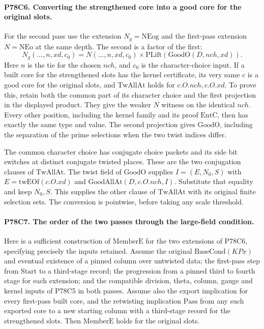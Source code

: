 \paragraph{P78C6. Converting the strengthened core into a good core for the original slots.}
For the second pass use the extension $N_g=\mathrm{NEog}$ and the
first-pass extension $N=\mathrm{NEo}$ at the same depth. The
second is a factor of the first:
\[
  N_g(\ldots,n,xd,c_0)
       = N(\ldots,n,xd,c_0)\times
            \mathrm{PLift}(\mathrm{GoodO}(D,nch,xd)).
\]
Here $n$ is the tie for the chosen $nch$, and $c_0$ is the
character-choice input. If a built core for the strengthened
slots has the kernel certificate, its very same $c$ is a good
core for the original slots, and $\mathrm{TwAllAt}$ holds for
$c.O.nch,c.O.xd$. To prove this, retain both the common part of
its character choice and the first projection in the displayed
product. They give the weaker $N$ witness on the identical $nch$.
Every other position, including the kernel family and its proof
$\mathrm{EntC}$, then has exactly the same type and value. The
second projection gives $\mathrm{GoodO}$, including the separation
of the prime selections when the two twist indices differ.

The common character choice has conjugate choice packets and its
side bit switches at distinct conjugate twisted places. These are
the two conjugation clauses of $\mathrm{TwAllAt}$. The twist field
of $\mathrm{GoodO}$ supplies
$I=(E,N_0,S)$ with $E=\mathrm{twEOf}(c.O.xd)$ and
$\mathrm{GoodAllAt}(D,c.O.nch,I)$. Substitute that equality
and keep $N_0,S$. This supplies the other clause of
$\mathrm{TwAllAt}$ with its original finite selection sets.
The conversion is pointwise, before taking any scale threshold.

\paragraph{P78C7. The order of the two passes through the large-field condition.}
Here is a sufficient construction of $\mathrm{MemberE}$ for the
two extensions of P78C6, specifying precisely the inputs retained.
Assume the original $\mathrm{BaseCond}(KPx)$ and eventual existence
of a pinned column over untwisted data; the first-pass step from
$\mathrm{Start}$ to a third-stage record; the progression from a
pinned third to fourth stage for each extension; and the compatible
division, theta, column, gauge and kernel inputs of P78C5 in both
passes. Assume also the export implication for every first-pass
built core, and the retwisting implication $\mathrm{Pass}$ from
any such exported core to a new starting column with a third-stage
record for the strengthened slots. Then $\mathrm{MemberE}$ holds
for the original slots.

